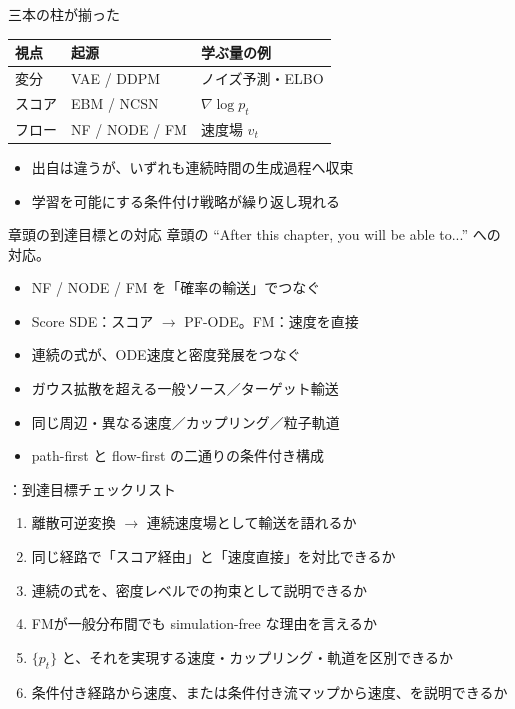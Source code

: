 \begin{frame}{三本の柱が揃った}
    \centering
    \renewcommand{\arraystretch}{1.35}
    \begin{tabular}{lll}
        \textbf{視点} & \textbf{起源} & \textbf{学ぶ量の例} \\
        \hline
        変分 & VAE / DDPM & ノイズ予測・ELBO \\
        スコア & EBM / NCSN & $\nabla\log p_t$ \\
        フロー & NF / NODE / FM & 速度場 $v_t$ \\
    \end{tabular}
    \vfill
    \begin{itemize}
        \item 出自は違うが、いずれも連続時間の生成過程へ収束
        \item 学習を可能にする条件付け戦略が繰り返し現れる
    \end{itemize}
\end{frame}
\asmain
\begin{frame}{章頭の到達目標との対応}
    章頭の ``After this chapter, you will be able to...'' への対応。
    \begin{itemize}
        \item NF / NODE / FM を「確率の輸送」でつなぐ
        \item Score SDE：スコア $\to$ PF-ODE。FM：速度を直接
        \item 連続の式が、ODE速度と密度発展をつなぐ
        \item ガウス拡散を超える一般ソース／ターゲット輸送
        \item 同じ周辺・異なる速度／カップリング／粒子軌道
        \item path-first と flow-first の二通りの条件付き構成
    \end{itemize}
\end{frame}
\assuppl
\begin{frame}{\supplmark：到達目標チェックリスト}
    \footnotesize
    \begin{enumerate}
        \item 離散可逆変換 $\to$ 連続速度場として輸送を語れるか
        \item 同じ経路で「スコア経由」と「速度直接」を対比できるか
        \item 連続の式を、密度レベルでの拘束として説明できるか
        \item FMが一般分布間でも simulation-free な理由を言えるか
        \item $\{p_t\}$ と、それを実現する速度・カップリング・軌道を区別できるか
        \item 条件付き経路から速度、または条件付き流マップから速度、を説明できるか
    \end{enumerate}
\end{frame}
